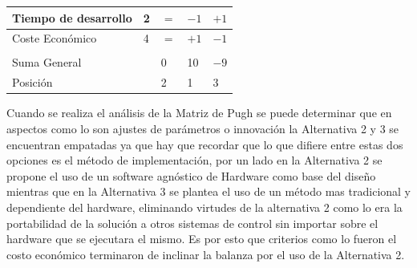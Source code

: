 \documentclass[12pt]{article}
\begin{document}
\begin{table}[!h]
\begin{tabular}{lllll}
    \multicolumn{1}{|l|}{\cellcolor[HTML]{DAE8FC}Tiempo de desarrollo}                & \multicolumn{1}{l|}{\cellcolor[HTML]{CBCEFB}2}    & \multicolumn{1}{l|}{$=$}                                   & \multicolumn{1}{l|}{$-1$}                                  & \multicolumn{1}{l|}{$+1$}                                  \\ \hline
    \multicolumn{1}{|l|}{\cellcolor[HTML]{DAE8FC}Coste Económico}                     & \multicolumn{1}{l|}{\cellcolor[HTML]{CBCEFB}4}    & \multicolumn{1}{l|}{$=$}                                   & \multicolumn{1}{l|}{$+1$}                                  & \multicolumn{1}{l|}{$-1$}                                  \\ \hline
                                                                                      &                                                   &                                                            &                                                            &                                                            \\ \cline{1-1} \cline{3-5}
    \multicolumn{1}{|l|}{\cellcolor[HTML]{DAE8FC}Suma General}                        & \multicolumn{1}{l|}{}                             & \multicolumn{1}{l|}{0}                                     & \multicolumn{1}{l|}{10}                                    & \multicolumn{1}{l|}{$-9$}                                  \\ \cline{1-1} \cline{3-5}
    \multicolumn{1}{|l|}{\cellcolor[HTML]{DAE8FC}Posición}                            & \multicolumn{1}{l|}{}                             & \multicolumn{1}{l|}{2}                                     & \multicolumn{1}{l|}{1}                                     & \multicolumn{1}{l|}{3}                                     \\ \cline{1-1} \cline{3-5}
  \end{tabular}
\end{table}


Cuando se realiza el análisis de la Matriz de Pugh se puede determinar que en aspectos como lo son ajustes de parámetros o innovación la Alternativa 2 y 3 se encuentran empatadas ya que hay que recordar que lo que difiere entre estas dos opciones es el método de implementación, por un lado en la Alternativa 2 se propone el uso de un software agnóstico de Hardware como base del diseño mientras que en la Alternativa 3 se plantea el uso de un método mas tradicional y dependiente del hardware, eliminando virtudes de la alternativa 2 como lo era la portabilidad de la solución a otros sistemas de control sin importar sobre el hardware que se ejecutara el mismo. Es por esto que criterios como lo fueron el costo económico terminaron de inclinar la balanza por el uso de la Alternativa 2.
\end{document}
